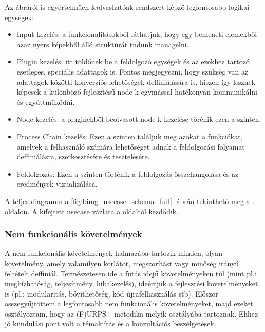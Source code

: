 \documentclass[a4paper,12pt,oneside]{report}
\begin{document}
Az ábráról is egyértelműen leolvashatóak rendszert képző legfontosabb logikai egységek:
\begin{itemize}
	\itemsep0em
	\item Input kezelés: a funkcionalitásokból láthatjuk, hogy egy bemeneti elemekből azaz nyers képekből álló struktúrát tudunk managelni.
	\item Plugin kezelés: itt töldőnek be a feldolgozó egységek és az ezekhez tartozó esetleges, speciális adattagok is. Fontos megjegyezni, hogy szükség van az adattagok közötti konverziós lehetőségek deffiniálására is, hiszen így lesznek képesek a különböző fejlesztésű node-k egymással hatékonyan kommunikálni és együttműködni.
	\item Node kezelés: a pluginekből beolvasott node-k kezelése törénik ezen a szinten.
	\item Process Chain kezelés: Ezen a szinten találjuk meg azokat a funkciókat, amelyek a felhasználó számára lehetőséget adnak a feldolgozási folyamat deffiniálásra, szerkesztésére és tesztelésére.
	\item Feldolgozás: Ezen a szinten történik a feldolgozás összehangolása és az eredmények vizualizálása.
\end{itemize}
A teljes diagramm a \ref{fig:bimg_usecase_schema_full}. ábrán tekinthető meg a \pageref{fig:bimg_usecase_schema_full}. oldalon. A kifejtett usecase vázlata a \pageref{fig:bimg_usecase_schema_full} oldaltól kezdődik.

\subsubsection{Nem funkcionális követelmények}
A nem funkcionális követelmények halmazába tartozik minden, olyan követelmény, amely valamilyen korlátot, megszorítást vagy minőség irányú feltételt deffiniál. \cite{publication:soft_nonfunc_req} Természetesen ide a futás idejű követelményeken túl (mint pl.: megbízhatóság, teljesítmény, hibakezelés), ideértjük a fejlesztési követelményeket is (pl.: modularitás, bővíthetőség, kód újrafelhasználás stb). Először összegyűjtöttem a legfontosabb nem funkcionális követelményeket, majd ezeket osztályoztam, hogy az (F)URPS+ metodika melyik osztályába tartoznak. Ehhez jó kiindulási pont volt a témakiírás és a konzultációs beszélgetések.
\end{document}
